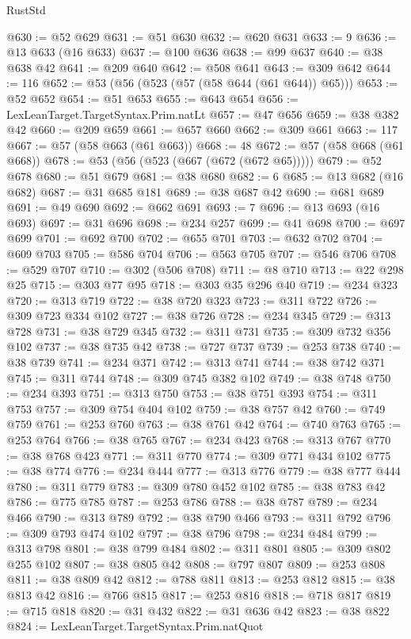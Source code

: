 \begin{lexlean}{RustStd}
\begin{coremodule}
{\begin{coremodule}
{{{{{{{{{{{{{{@630 := @52 @629
@631 := @51 @630
@632 := @620 @631
@633 := 9
@636 := @13 @633 (@16 @633)
@637 := @100 @636
@638 := @99 @637
@640 := @38 @638 @42
@641 := @209 @640
@642 := @508 @641
@643 := @309 @642
@644 := 116
@652 := @53 (@56 (@523 (@57 (@58 @644 (@61 @644)) @65)))
@653 := @52 @652
@654 := @51 @653
@655 := @643 @654
@656 := LexLeanTarget.TargetSyntax.Prim.natLt
@657 := @47 @656
@659 := @38 @382 @42
@660 := @209 @659
@661 := @657 @660
@662 := @309 @661
@663 := 117
@667 := @57 (@58 @663 (@61 @663))
@668 := 48
@672 := @57 (@58 @668 (@61 @668))
@678 := @53 (@56 (@523 (@667 (@672 (@672 @65)))))
@679 := @52 @678
@680 := @51 @679
@681 := @38 @680
@682 := 6
@685 := @13 @682 (@16 @682)
@687 := @31 @685 @181
@689 := @38 @687 @42
@690 := @681 @689
@691 := @49 @690
@692 := @662 @691
@693 := 7
@696 := @13 @693 (@16 @693)
@697 := @31 @696
@698 := @234 @257
@699 := @41 @698
@700 := @697 @699
@701 := @692 @700
@702 := @655 @701
@703 := @632 @702
@704 := @609 @703
@705 := @586 @704
@706 := @563 @705
@707 := @546 @706
@708 := @529 @707
@710 := @302 (@506 @708)
@711 := @8 @710
@713 := @22 @298 @25
@715 := @303 @77 @95
@718 := @303 @35 @296 @40
@719 := @234 @323
@720 := @313 @719
@722 := @38 @720 @323
@723 := @311 @722
@726 := @309 @723 @334 @102
@727 := @38 @726
@728 := @234 @345
@729 := @313 @728
@731 := @38 @729 @345
@732 := @311 @731
@735 := @309 @732 @356 @102
@737 := @38 @735 @42
@738 := @727 @737
@739 := @253 @738
@740 := @38 @739
@741 := @234 @371
@742 := @313 @741
@744 := @38 @742 @371
@745 := @311 @744
@748 := @309 @745 @382 @102
@749 := @38 @748
@750 := @234 @393
@751 := @313 @750
@753 := @38 @751 @393
@754 := @311 @753
@757 := @309 @754 @404 @102
@759 := @38 @757 @42
@760 := @749 @759
@761 := @253 @760
@763 := @38 @761 @42
@764 := @740 @763
@765 := @253 @764
@766 := @38 @765
@767 := @234 @423
@768 := @313 @767
@770 := @38 @768 @423
@771 := @311 @770
@774 := @309 @771 @434 @102
@775 := @38 @774
@776 := @234 @444
@777 := @313 @776
@779 := @38 @777 @444
@780 := @311 @779
@783 := @309 @780 @452 @102
@785 := @38 @783 @42
@786 := @775 @785
@787 := @253 @786
@788 := @38 @787
@789 := @234 @466
@790 := @313 @789
@792 := @38 @790 @466
@793 := @311 @792
@796 := @309 @793 @474 @102
@797 := @38 @796
@798 := @234 @484
@799 := @313 @798
@801 := @38 @799 @484
@802 := @311 @801
@805 := @309 @802 @255 @102
@807 := @38 @805 @42
@808 := @797 @807
@809 := @253 @808
@811 := @38 @809 @42
@812 := @788 @811
@813 := @253 @812
@815 := @38 @813 @42
@816 := @766 @815
@817 := @253 @816
@818 := @718 @817
@819 := @715 @818
@820 := @31 @432
@822 := @31 @636 @42
@823 := @38 @822
@824 := LexLeanTarget.TargetSyntax.Prim.natQuot
}}}}}}}}}}}}}}
\end{coremodule}}
\end{coremodule}
\end{lexlean}
